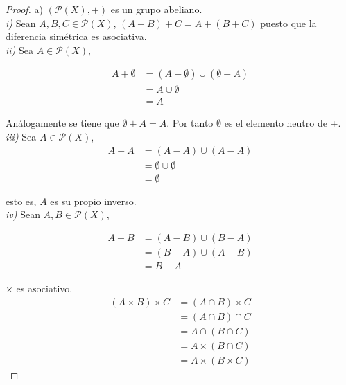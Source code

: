 \begin{proof}
a) $(\mathcal{P}(X), + )$ es un grupo abeliano.\\

\textit{i)} Sean $A,B,C \in \mathcal{P}(X)$, $(A+B)+C = A+(B+C)$ puesto que la diferencia simétrica es asociativa. \\

\textit{ii)} Sea $A \in \mathcal{P}(X)$, 

\begin{equation*}
\begin{split}
    A + \emptyset &= (A - \emptyset) \cup (\emptyset - A)\\
                  &= A \cup \emptyset\\
                  &= A
\end{split}
\end{equation*}

Análogamente se tiene que $\emptyset + A = A$. Por tanto $\emptyset$ es el elemento neutro de +.\\

\textit{iii)} Sea $A \in \mathcal{P}(X)$, 
\begin{equation*}
\begin{split}
    A+A &= (A-A) \cup (A-A)\\
        &= \emptyset \cup \emptyset\\
        &= \emptyset
\end{split}
\end{equation*}

esto es, $A$ es su propio inverso.\\

\textit{iv)} Sean $A,B \in \mathcal{P}(X)$,

\begin{equation*}
\begin{split}
    A+B &= (A-B) \cup (B-A)\\
        &= (B-A) \cup (A-B)\\
        &= B + A
\end{split}
\end{equation*}

\vspace{3mm}

$\times$ es asociativo.\\

\begin{equation*}
\begin{split}
    (A\times B)\times C &= (A \cap B)\times C\\
                      &= (A \cap B)\cap C \\
                      &= A \cap (B \cap C)\\
                      &= A \times (B \cap C)\\
                      &= A \times (B \times C)
\end{split}
\end{equation*}


\end{proof}
